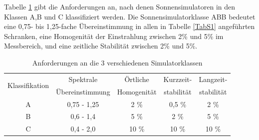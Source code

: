 \documentclass[a4paper,bibtotoc,oneside]{scrbook}
\begin{document}
Tabelle \ref{TabS2} gibt die Anforderungen an, nach denen Sonnensimulatoren in den Klassen A,B und C klassifiziert werden. Die Sonnensimulatorklasse ABB bedeutet eine 0,75- bis 1,25-fache Übereinstimmung in allen in Tabelle \ref{TabS1} angeführten Schranken, eine Homogenität der Einstrahlung zwischen 2\% und 5\% im Messbereich, und eine zeitliche Stabilität zwischen 2\% und 5\%. 
\begin{table}[htbp]
\centering
\begin{tabular}{ | c | c | c | c | c |}\hline
\multirow{2}{*}{Klassifikation} &  Spektrale  &  Örtliche  & {Kurzzeit-}& {Langzeit-}\\
& Übereinstimmung & Homogenität & {stabilität} & {stabilität} \\ 
\hline
\hline
A  & 0,75 - 1,25 & 2 \% & 0,5 \% & 2 \%\\ \hline
B  & 0,6 - 1,4 & 5 \% & 2 \% & 5 \%\\ \hline
C  & 0,4 - 2,0 & 10 \% & 10 \% & 10 \%\\ \hline
\end{tabular}
\caption{Anforderungen an die 3 verschiedenen Simulatorklassen}\label{TabS2}
\end{table}
\end{document}
